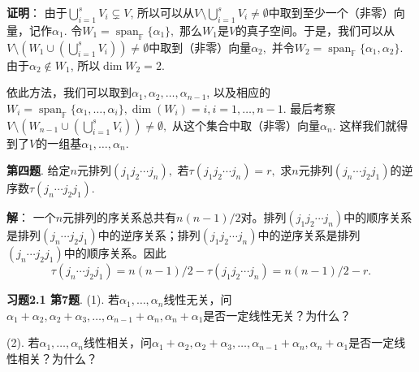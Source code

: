 \newpageorvspace

{\bf 证明}： 由于$\displaystyle \bigcup_{i=1}^s V_i \subsetneq V$, 所以可以从$V \setminus \bigcup_{i=1}^s V_i \neq \emptyset$中取到至少一个（非零）向量，记作$\alpha_1.$ 令$W_1 = \operatorname{span}_{\mathbb{F}}\{\alpha_1\},$ 那么$W_1$是$V$的真子空间。于是，我们可以从$V \setminus \left( W_1 \cup \left( \bigcup_{i=1}^s V_i \right) \right) \neq \emptyset$中取到（非零）向量$\alpha_2,$ 并令$W_2 = \operatorname{span}_{\mathbb{F}}\{\alpha_1, \alpha_2\}$. 由于$\alpha_2 \not\in W_1$, 所以$\dim W_2 = 2$.

依此方法，我们可以取到$\alpha_1, \alpha_2, \ldots, \alpha_{n-1}$, 以及相应的$W_i = \operatorname{span}_{\mathbb{F}}\{\alpha_1, \ldots, \alpha_i\}, \dim (W_i) = i, i=1, \ldots, n-1$. 最后考察$V \setminus \left( W_{n-1} \cup \left( \bigcup_{i=1}^s V_i \right) \right) \neq \emptyset,$ 从这个集合中取（非零）向量$\alpha_n$. 这样我们就得到了$V$的一组基$\alpha_1, \ldots, \alpha_n.$

\newpageorvspace

{\bf 第四题}. 给定$n$元排列$(j_1j_2\cdots j_n),$ 若$\tau(j_1j_2\cdots j_n) = r,$ 求$n$元排列$(j_n\cdots j_2j_1)$的逆序数$\tau(j_n\cdots j_2j_1)$.

\newpageorvspace

{\bf 解}： 一个$n$元排列的序关系总共有$n(n-1)/2$对。排列$(j_1j_2\cdots j_n)$中的顺序关系是排列$(j_n\cdots j_2j_1)$中的逆序关系；排列$(j_1j_2\cdots j_n)$中的逆序关系是排列$(j_n\cdots j_2j_1)$中的顺序关系。因此
$$\tau(j_n\cdots j_2j_1) = n(n-1)/2 - \tau(j_1j_2\cdots j_n) = n(n-1)/2 - r.$$

\newpageorvspace

{\bf 习题2.1 第7题}. (1). 若$\alpha_1, \ldots, \alpha_n$线性无关，问$\alpha_1 + \alpha_2, \alpha_2 + \alpha_3, \ldots, \alpha_{n-1} + \alpha_n, \alpha_n + \alpha_1$是否一定线性无关？为什么？

(2). 若$\alpha_1, \ldots, \alpha_n$线性相关，问$\alpha_1 + \alpha_2, \alpha_2 + \alpha_3, \ldots, \alpha_{n-1} + \alpha_n, \alpha_n + \alpha_1$是否一定线性相关？为什么？

\newpageorvspace

